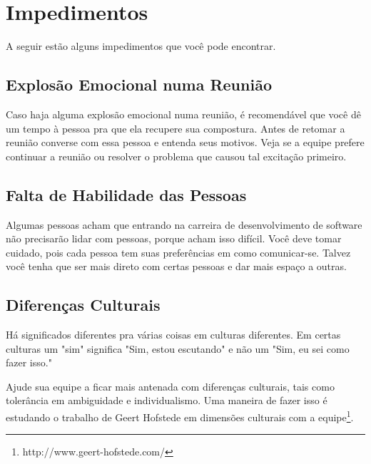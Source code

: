 \documentclass[a4paper, 10pt, font=plain]{abnt}
\begin{document}
\section{Impedimentos}
A seguir estão alguns impedimentos que você pode encontrar.

\subsection{Explosão Emocional numa Reunião}
Caso haja alguma explosão emocional numa reunião, é recomendável que você dê um tempo à pessoa pra que ela recupere sua compostura. Antes de retomar a reunião converse com essa pessoa e entenda seus motivos. Veja se a equipe prefere continuar a reunião ou resolver o problema que causou tal excitação primeiro.

\subsection{Falta de Habilidade das Pessoas}
Algumas pessoas acham que entrando na carreira de desenvolvimento de software não precisarão lidar com pessoas, porque acham isso difícil. Você deve tomar cuidado, pois cada pessoa tem suas preferências em como comunicar-se. Talvez você tenha que ser mais direto com certas pessoas e dar mais espaço a outras.

\subsection{Diferenças Culturais}
Há significados diferentes pra várias coisas em culturas diferentes. Em certas culturas um "sim" significa "Sim, estou escutando" e não um "Sim, eu sei como fazer isso."

Ajude sua equipe a ficar mais antenada com diferenças culturais, tais como tolerância em ambiguidade e individualismo. Uma maneira de fazer isso é estudando o trabalho de Geert Hofstede em dimensões culturais com a equipe\footnote{http://www.geert-hofstede.com/}.
\end{document}
